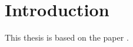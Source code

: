 \section{Introduction}
\label{sec:introduction}

This thesis is based on the paper \textcite{kaji2023adversarial}.